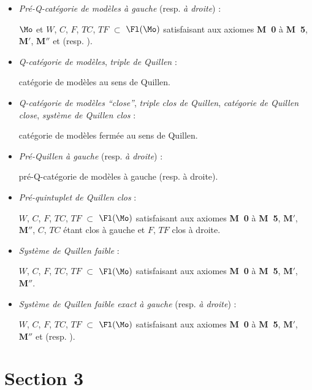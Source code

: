 \begin{itemize}
\item[\textbullet] \textit{Pré-Q-catégorie de modèles à gauche} (resp. \textit{à droite}) :

$\Mo$ et $W$, $C$, $F$, $TC$, $TF$ $\subset$ $\Fl(\Mo)$ satisfaisant aux axiomes \textbf{M~0} à \textbf{M~5}, $\mathbf{M}'$, $\mathbf{M}''$ et \Mzg{} (resp. \Mzd).

\item[\textbullet] \textit{Q-catégorie de modèles}, \textit{triple de Quillen} :

catégorie de modèles au sens de Quillen.

\item[\textbullet] \textit{Q-catégorie de modèles “close”}, \textit{triple clos de Quillen}, \textit{catégorie de Quillen close}, \textit{système de Quillen clos} :

catégorie de modèles fermée au sens de Quillen.

\item[\textbullet] \textit{Pré-Quillen à gauche} (resp. \textit{à droite}) :

pré-Q-catégorie de modèles à gauche (resp. à droite).

\item[\textbullet] \textit{Pré-quintuplet de Quillen clos} :

$W$, $C$, $F$, $TC$, $TF$ $\subset$ $\Fl(\Mo)$ satisfaisant aux axiomes \textbf{M~0} à \textbf{M~5}, $\mathbf{M}'$, $\mathbf{M}''$, $C$, $TC$ étant clos à gauche et $F$, $TF$ clos à droite.

\item[\textbullet] \textit{Système de Quillen faible} :

$W$, $C$, $F$, $TC$, $TF$ $\subset$ $\Fl(\Mo)$ satisfaisant aux axiomes \textbf{M~0} à \textbf{M~5}, $\mathbf{M}'$, $\mathbf{M}''$.

\item[\textbullet] \textit{Système de Quillen faible exact à gauche} (resp. \textit{à droite}) :

$W$, $C$, $F$, $TC$, $TF$ $\subset$ $\Fl(\Mo)$ satisfaisant aux axiomes \textbf{M~0} à \textbf{M~5}, $\mathbf{M}'$, $\mathbf{M}''$ et \Mzg{} (resp. \Mzd).
\end{itemize}

\section*{Section 3}

